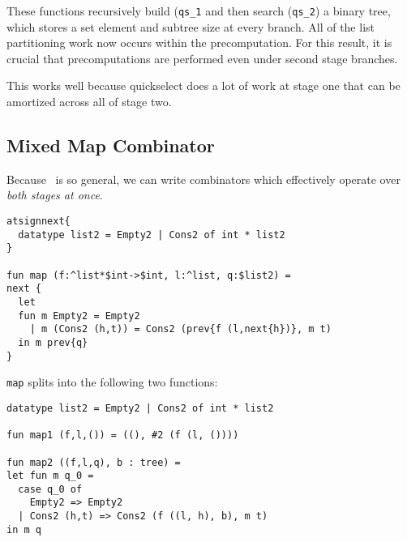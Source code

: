 These functions recursively build ({\tt qs\_1} and then search ({\tt qs\_2}) a binary tree,
which stores a set element and subtree size at every branch.
All of the list partitioning work now occurs within the precomputation.
For this result, it is crucial that precomputations are performed even under second stage branches.

This works well because quickselect does a lot of work at stage one that can be amortized across all of stage two.

\subsection {Mixed Map Combinator}


Because \lang\ is so general, we can write combinators which effectively operate over {\em both stages at once}.

\begin{lstlisting} 
atsignnext{
  datatype list2 = Empty2 | Cons2 of int * list2
}

fun map (f:^list*$int->$int, l:^list, q:$list2) = 
next {
  let 
  fun m Empty2 = Empty2
    | m (Cons2 (h,t)) = Cons2 (prev{f (l,next{h})}, m t)
  in m prev{q}
}
\end{lstlisting}

\noindent
{\tt map} splits into the following two functions:

\begin{lstlisting} 
datatype list2 = Empty2 | Cons2 of int * list2

fun map1 (f,l,()) = ((), #2 (f (l, ())))

fun map2 ((f,l,q), b : tree) = 
let fun m q_0 =
  case q_0 of 
    Empty2 => Empty2 
  | Cons2 (h,t) => Cons2 (f ((l, h), b), m t)
in m q
\end{lstlisting}
